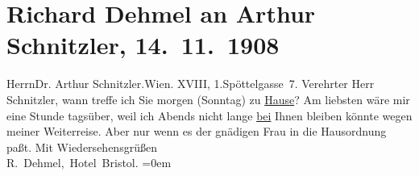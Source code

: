 

         
         \renewcommand{\erwaehntePersonen}{Personen: Olga Schnitzler}
         \renewcommand{\erwaehnteOrte}{Orte: Edmund-Weiß-Gasse, Hotel Bristol, I., Innere Stadt, Wien, XVIII., Währing}
         \renewcommand{\erwaehnteWerke}{}
               \section[Richard Dehmel an Arthur Schnitzler, 14. 11. 1908]{ Richard Dehmel an Arthur Schnitzler, 14. 11. 1908}\nopagebreak{}\rehead{ }\begin{ledgroupsized}[t]{13cm}\normalsize\beginnumbering \toendnotes[C]{\smallbreak\pagebreak[2]} 
\pstart{}{\pb}Herrn\pend{}\pstart{}Dr. Arthur Schnitzler.\pend{}\pstart{}Wien. XVIII, 1.\pend{}\pstart{}Spöttelgasse 7.\pend{}{\bigskip}\pstart
           \noindent{}{\pb}Verehrter Herr Schnitzler, wann treffe ich Sie morgen
                  (Sonntag) zu \uline{Hause}? Am liebsten wäre
               mir eine Stunde tagsüber, weil ich Abends  nicht lange \uline{bei} Ihnen bleiben könnte
               wegen meiner Weiterreise. Aber nur wenn es der gnädigen Frau in die Hausordnung paßt.\pend
           \pstart
           Mit Wiedersehensgrüßen{\\[\baselineskip]}\spacefill\mbox{R. Dehmel, Hotel Bristol}.\pend
           \leftskip=0em{}
         
         \endnumbering{}\end{ledgroupsized}  \newcommand{\dateiname}{L01801}\newcommand{\titel}{Richard Dehmel an Arthur Schnitzler, 14. 11. 1908}\newcommand{\editorInnen}{Martin Anton Müller und Gerd-Hermann Susen}
      